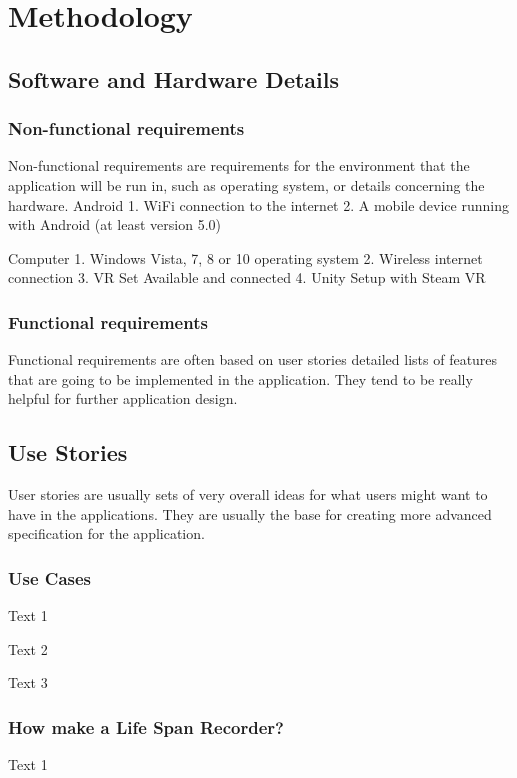 \chapter{Methodology}
\label{chap:meth}
  
\section{Software and Hardware Details} \label{sec:m1}
  
\subsection{Non-functional requirements} \label{sec:m1.1}

Non-functional requirements are requirements for the environment that the application
will be run in, such as operating system, or details concerning the hardware.
Android
1. WiFi connection to the internet
2. A mobile device running with Android (at least version 5.0)

Computer
1. Windows Vista, 7, 8 or 10 operating system
2. Wireless internet connection
3. VR Set Available and connected
4. Unity Setup with Steam VR

\subsection{Functional requirements} \label{sec:m1.2}

Functional requirements are often based on user stories detailed lists of features that
are going to be implemented in the application. They tend to be really helpful for further
application design.

\section{Use Stories} \label{sec:m2}
User stories are usually sets of very overall ideas for what users might want to have in
the applications. They are usually the base for creating more advanced specification for
the application.

\subsection{Use Cases} \label{sec:m2.1}
Text 1

Text 2

Text 3

\subsection{How make a Life Span Recorder?} \label{sec:m2.2}
Text 1

